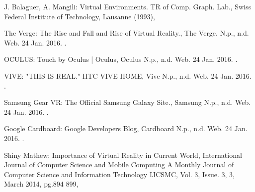\begin{bib}[100]




\begin{flushleft}
  J. Balaguer, A. Mangili:
  \newblock Virtual Environments. TR of Comp. Graph. Lab.,
  \newblock Swiss Federal Institute of Technology, Lausanne (1993),
\end{flushleft}

\begin{flushleft}
  The Verge:
  \newblock The Rise and Fall and Rise of Virtual Reality.,
  \newblock The Verge. N.p., n.d. Web. 24 Jan. 2016.
   .
\end{flushleft}

\begin{flushleft}
  OCULUS:
  \newblock Touch by Oculus | Oculus,
  \newblock Oculus N.p., n.d. Web. 24 Jan. 2016.
   .
\end{flushleft}

\begin{flushleft}
  VIVE:
  \newblock "THIS IS REAL." HTC VIVE HOME,
  \newblock Vive N.p., n.d. Web. 24 Jan. 2016.
   .
\end{flushleft}

\begin{flushleft}
  Samsung Gear VR:
  \newblock The Official Samsung Galaxy Site.,
  \newblock Samsung N.p., n.d. Web. 24 Jan. 2016.
   .
\end{flushleft}

\begin{flushleft}
  Google Cardboard:
  \newblock Google Developers Blog,
  \newblock Cardboard N.p., n.d. Web. 24 Jan. 2016.
   .
\end{flushleft}

\begin{flushleft}
  Shiny Mathew:
  \newblock Importance of Virtual Reality in Current World,
  \newblock International Journal of Computer Science and Mobile Computing A Monthly Journal of Computer Science and Information Technology IJCSMC, Vol. 3, Issue. 3, 3, March 2014, pg.894  899,
\end{flushleft}


\end{bib}
